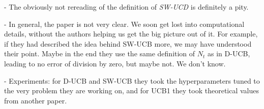 - The obviously not rereading of the definition of \textit{SW-UCD} is definitely a pity.

- In general, the paper is not very clear. We soon get lost into computational details, without the authors helping us get the big picture out of it. For example, if they had described the idea behind SW-UCB more, we may have understood their point. Maybe in the end they use the same definition of $N_t$ as in D-UCB, leading to no error of division by zero, but maybe not. We don't know.

- Experiments: for D-UCB and SW-UCB they took the hyperparameters tuned to the very problem they are working on, and for UCB1 they took theoretical values from another paper.